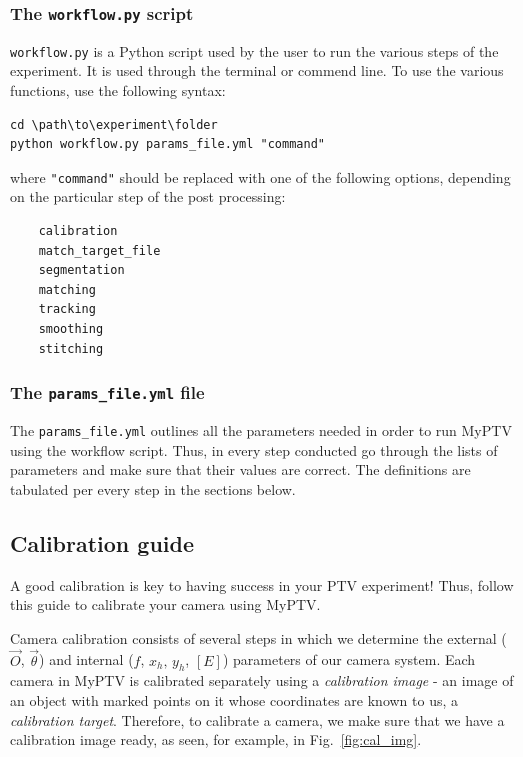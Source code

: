 \documentclass[10pt,a4paper]{article}
\begin{document}
\subsubsection{The \texttt{workflow.py} script}

\texttt{workflow.py} is a Python script used by the user to run the various steps of the experiment. It is used through the terminal or commend line. To use the various functions, use the following syntax:
\begin{verbatim}
cd \path\to\experiment\folder
python workflow.py params_file.yml "command"
\end{verbatim}
where \texttt{"command"} should be replaced with one of the following options, depending on the particular step of the post processing:
%
\begin{verbatim}
	calibration
	match_target_file
	segmentation
	matching
	tracking	
	smoothing
	stitching
\end{verbatim}



\subsubsection{The \texttt{params\_file.yml} file}

The \texttt{params\_file.yml} outlines all the parameters needed in order to run MyPTV using the workflow script. Thus, in every step conducted go through the lists of parameters and make sure that their values are correct. The definitions are tabulated per every step in the sections below.







\subsection{Calibration guide}

A good calibration is key to having success in your PTV experiment! Thus, follow this guide to calibrate your camera using MyPTV. 


Camera calibration consists of several steps in which we determine the external ($\vec{O}$, $\vec{\theta}$) and internal ($f$, $x_h,\,y_h$, $[E]$) parameters of our camera system. Each camera in MyPTV is calibrated separately using a \textit{calibration image} - an image of an object with marked points on it whose coordinates are known to us, a \textit{calibration target}. Therefore, to calibrate a camera, we make sure that we have a calibration image ready, as seen, for example, in Fig.~\ref{fig:cal_img}. 
\end{document}
